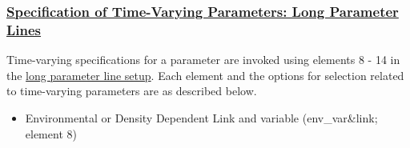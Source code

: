 \hypertarget{SpecTVLong}{}
\subsubsection[Specification of Time-Varying Parameters: Long Parameter Lines]{\protect\hyperlink{SpecTVLong}{Specification of Time-Varying Parameters: Long Parameter Lines}}

Time-varying specifications for a parameter are invoked using elements 8 - 14 in the \hyperlink{paraOrder}{long parameter line setup}. Each element and the options for selection related to time-varying parameters are as described below.

\hypertarget{EnvVar}{}
\begin{itemize}

\item Environmental or Density Dependent Link and variable (env\_var\&link; element 8)


\end{itemize}

